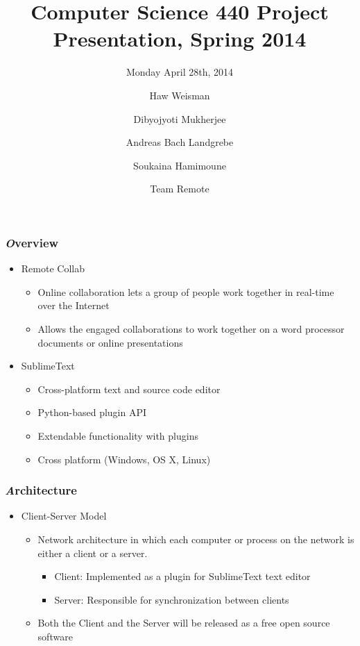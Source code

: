 \documentclass{beamer}
\title[Crisis] %
{Computer Science 440 Project Presentation, Spring 2014}
\subtitle{Monday April 28th, 2014}
\author[Hawk Weisman, Dibyojyoti Mukherjee, Andreas Bach Landgrebe, Soukaina Hamimoune] %
{Haw Weisman\inst{1} \and Dibyojyoti Mukherjee\inst{1}\\ \and Andreas Bach Landgrebe\inst{1} \and Soukaina Hamimoune\inst{2}}
\institute[Allegheny College, Department of Computer Science] %
{
  \inst{1}%
  Allgheny College\\
  Department of Computer Science
  \and
  \inst{2}%
  Al Akhawayn University\\
  Department of Computer Science
}
\date[April 28, 2014] %
{Team Remote}
\begin{document}
\frame{\titlepage}

\begin{frame}
\frametitle {\textbf{\textit Overview}}
\begin{itemize}
\item Remote Collab
\begin{itemize}
\item Online collaboration lets a group of people work together in real-time over the Internet
\item Allows the engaged collaborations to work together on a word processor documents or online presentations
\end{itemize}
\item SublimeText
\begin{itemize}
\item Cross-platform text and source code editor
\item Python-based plugin API
\item Extendable functionality with plugins
\item Cross platform (Windows, OS X, Linux)
\end{itemize}
\end{itemize}
\end{frame}

\begin{frame}
\frametitle {\textbf{\textit Architecture}}
\begin{itemize}
\item Client-Server Model
\begin{itemize}
\item Network architecture in which each computer or process on the network is either a client or a server.
\begin{itemize}
\item Client: Implemented as a plugin for SublimeText text editor
\item Server: Responsible for synchronization between clients
\end{itemize}
\item Both the Client and the Server will be released as a free open source software
\end{itemize}
\end{itemize}
\end{frame}
\end{document}
